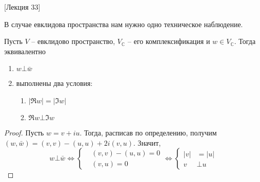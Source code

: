 [Лекция 33]


В случае евклидова пространства нам нужно одно техническое наблюдение.

\begin{claim}
\label{claim::OrthoRealfix}
Пусть $V$ -- евклидово пространство, $V_\mathbb C$ -- его комплексификация и $w\in V_\mathbb C$.
Тогда эквивалентно
\begin{enumerate}
\item $w\bot \bar w$

\item выполнены два условия:
\begin{enumerate}
\item $|\Re w | = |\Im w|$

\item $\Re w \bot \Im w$
\end{enumerate}
\end{enumerate}
\end{claim}
\begin{proof}
Пусть $w = v+ iu$.
Тогда, расписав по определению, получим $(w, \bar w) = (v, v) - (u,u) +2i(v,u)$.
Значит, 
\[
w\bot \bar w \iff
\left\{
\begin{aligned}
&(v,v) - (u,u) = 0\\
&(v,u) = 0
\end{aligned}
\right.
\iff
\left\{
\begin{aligned}
|v| &= |u|\\
v &\bot u
\end{aligned}
\right.
\]
\end{proof}

